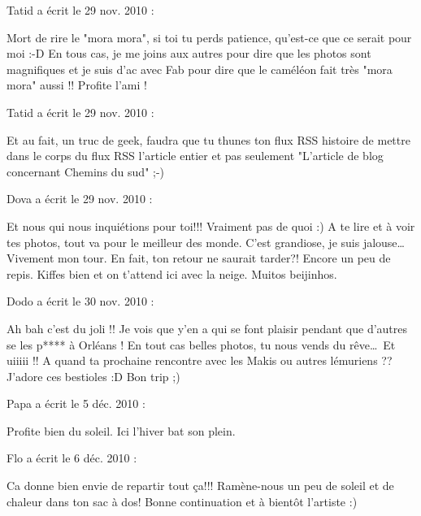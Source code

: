 \medskip
Tatid a écrit le 29 nov. 2010 :
\begin{displayquote}
Mort de rire le "mora mora", si toi tu perds patience, qu'est-ce que ce serait pour moi :-D
En tous cas, je me joins aux autres pour dire que les photos sont magnifiques et je suis d'ac avec Fab pour dire que le caméléon fait très "mora mora" aussi !!
Profite l'ami !
\end{displayquote}

\medskip
Tatid a écrit le 29 nov. 2010 :
\begin{displayquote}
Et au fait, un truc de geek, faudra que tu thunes ton flux RSS histoire de mettre dans le corps du flux RSS l'article entier et pas seulement "L'article de blog concernant Chemins du sud" ;-)
\end{displayquote}

\medskip
Dova a écrit le 29 nov. 2010 :
\begin{displayquote}
Et nous qui nous inquiétions pour toi!!!
Vraiment pas de quoi :)
A te lire et à voir tes photos, tout va pour le meilleur des monde.
C'est grandiose, je suis jalouse\dots Vivement mon tour.
En fait, ton retour ne saurait tarder?! Encore un peu de repis. Kiffes bien et on t'attend ici avec la neige.
Muitos beijinhos.
\end{displayquote}

\medskip
Dodo a écrit le 30 nov. 2010 :
\begin{displayquote}
Ah bah c'est du joli !! Je vois que y'en a qui se font plaisir pendant que d'autres se les p**** à Orléans !
En tout cas belles photos, tu nous vends du rêve\dots Et uiiiii !! A quand ta prochaine rencontre avec les Makis ou autres lémuriens ?? J'adore ces bestioles :D
Bon trip ;)
\end{displayquote}

\medskip
Papa a écrit le 5 déc. 2010 :
\begin{displayquote}
Profite bien du soleil. Ici l'hiver bat son plein.
\end{displayquote}

\medskip
Flo a écrit le 6 déc. 2010 :
\begin{displayquote}
Ca donne bien envie de repartir tout ça!!!
Ramène-nous un peu de soleil et de chaleur dans ton sac à dos!
Bonne continuation et à bientôt l'artiste :)
\end{displayquote}

\vfill
